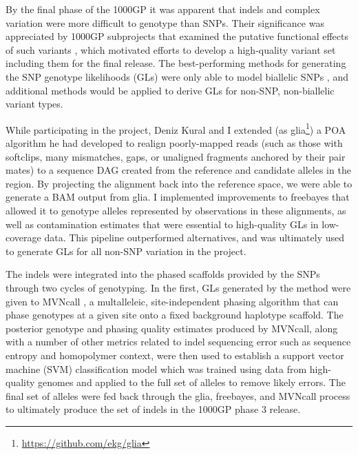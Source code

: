 \documentclass[a4paper,12pt,numbered,oneside]{Classes/PhDThesisPSnPDF}
\begin{document}
By the final phase of the 1000GP \cite{1000g2015} it was apparent that indels and complex variation were more difficult to genotype than SNPs.
Their significance was appreciated by 1000GP subprojects that examined the putative functional effects of such variants \cite{challis2015distribution}, which motivated efforts to develop a high-quality variant set including them for the final release.
The best-performing methods for generating the SNP genotype likelihoods (GLs) were only able to model biallelic SNPs \cite{snptools}, and additional methods would be applied to derive GLs for non-SNP, non-biallelic variant types.

While participating in the project, Deniz Kural and I extended (as glia\footnote{\url{https://github.com/ekg/glia}}) a POA algorithm he had developed to realign poorly-mapped reads (such as those with softclips, many mismatches, gaps, or unaligned fragments anchored by their pair mates) to a sequence DAG created from the reference and candidate alleles in the region.
By projecting the alignment back into the reference space, we were able to generate a BAM output from glia.
I implemented improvements to freebayes that allowed it to genotype alleles represented by observations in these alignments, as well as contamination estimates that were essential to high-quality GLs in low-coverage data.
This pipeline outperformed alternatives, and was ultimately used to generate GLs for all non-SNP variation in the project.

The indels were integrated into the phased scaffolds provided by the SNPs through two cycles of genotyping.
In the first, GLs generated by the method were given to MVNcall \cite{menelaou2012genotype}, a multalleleic, site-independent phasing algorithm that can phase genotypes at a given site onto a fixed background haplotype scaffold.
The posterior genotype and phasing quality estimates produced by MVNcall, along with a number of other metrics related to indel sequencing error such as sequence entropy and homopolymer context, were then used to establish a support vector machine (SVM) classification model which was trained using data from high-quality genomes and applied to the full set of alleles to remove likely errors.
The final set of alleles were fed back through the glia, freebayes, and MVNcall process to ultimately produce the set of indels in the 1000GP phase 3 release.
\end{document}
